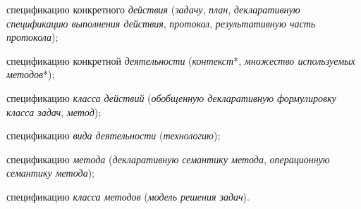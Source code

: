 \begin{SCn}
\begin{scnindent}
{	        \begin{scnitemize}
	            \item спецификацию конкретного \textit{действия} (\textit{задачу}, \textit{план}, \textit{декларативную спецификацию выполнения действия}, \textit{протокол}, \textit{результативную часть протокола});
	            \item спецификацию конкретной \textit{деятельности} (\textit{контекст}*, \textit{множество используемых методов}*);
	            \item спецификацию \textit{класса действий} (\textit{обобщенную декларативную формулировку класса задач}, \textit{метод});
	            \item спецификацию \textit{вида деятельности} (\textit{технологию});
	            \item спецификацию \textit{метода} (\textit{декларативную семантику метода}, \textit{операционную семантику метода});
	            \item спецификацию \textit{класса методов} (\textit{модель решения задач}).
	        \end{scnitemize}}
    \end{scnindent}
    
    \begin{scnhaselementset}
        \scnitem{\scnnonamednode}
        \begin{scnindent}
            \begin{scneqtovector}
            \end{scneqtovector}
        \end{scnindent}
        \scnitem{\scnnonamednode}
        \begin{scnindent}
            \begin{scneqtovector}
            \end{scneqtovector}
        \end{scnindent}
    \end{scnhaselementset}
    
    \bigskip
    

\end{SCn}

